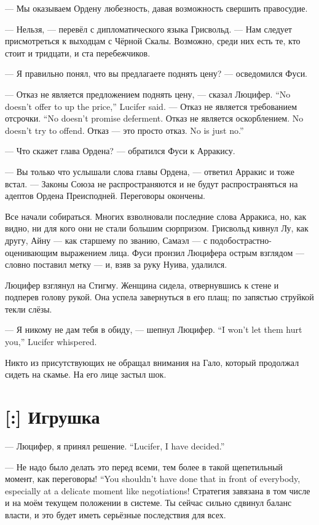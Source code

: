 --- Мы оказываем Ордену любезность, давая возможность свершить правосудие.

--- Нельзя, --- перевёл с дипломатического языка Грисвольд.
--- Нам следует присмотреться к выходцам с Чёрной Скалы.
Возможно, среди них есть те, кто стоит и тридцати, и ста перебежчиков.

--- Я правильно понял, что вы предлагаете поднять цену? --- осведомился Фуси.

{--- Отказ не является предложением поднять цену, --- сказал Люцифер.}
{``No doesn't offer to up the price,'' Lucifer said.}
{--- Отказ не является требованием отсрочки.}
{``No doesn't promise deferment.}
{Отказ не является оскорблением.}
{No doesn't try to offend.}
{Отказ --- это просто отказ.}
{No is just no.''}

--- Что скажет глава Ордена? --- обратился Фуси к Арракису.

--- Вы только что услышали слова главы Ордена, --- ответил Арракис и тоже встал.
--- Законы Союза не распространяются и не будут распространяться на адептов Ордена Преисподней.
Переговоры окончены.

Все начали собираться.
Многих взволновали последние слова Арракиса, но, как видно, ни для кого они не стали большим сюрпризом.
Грисвольд кивнул Лу, как другу, Айну --- как старшему по званию, Самаэл --- с подобострастно-оценивающим выражением лица.
Фуси пронзил Люцифера острым взглядом --- словно поставил метку --- и, взяв за руку Нуива, удалился.

Люцифер взглянул на Стигму.
Женщина сидела, отвернувшись к стене и подперев голову рукой.
Она успела завернуться в его плащ;
по запястью струйкой текли слёзы.

{--- Я никому не дам тебя в обиду, --- шепнул Люцифер.}
{``I won't let them hurt you,'' Lucifer whispered.}

Никто из присутствующих не обращал внимания на Гало, который продолжал сидеть на скамье.
На его лице застыл шок.

\section{[:] Игрушка}

{--- Люцифер, я принял решение.}
{``Lucifer, I have decided.''}

{--- Не надо было делать это перед всеми, тем более в такой щепетильный момент, как переговоры!}
{``You shouldn't have done that in front of everybody, especially at a delicate moment like negotiations!}
Стратегия завязана в том числе и на моём текущем положении в системе.
Ты сейчас сильно сдвинул баланс власти, и это будет иметь серьёзные последствия для всех.

